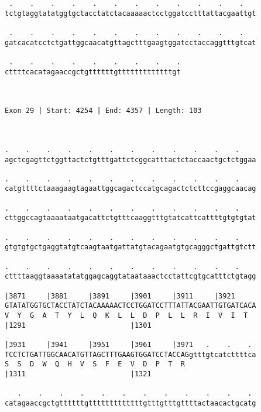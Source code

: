 \documentclass{article}
\begin{document}
\begin{Verbatim}
 .    .    .    .    .    .    .    .    .    .    .    .   
tctgtaggtatatggtgctacctatctacaaaaactcctggatcctttattacgaattgt
                                                            
 .    .    .    .    .    .    .    .    .    .    .    .   
gatcacatcctctgattggcaacatgttagctttgaagtggatcctaccaggtttgtcat
                                                            
 .    .    .    .    .    .    .    .    .
cttttcacatagaaccgctgttttttgtttttttttttttgt
                                          
                                          
 
Exon 29 | Start: 4254 | End: 4357 | Length: 103



.    .    .    .    .    .    .    .    .    .    .    .    
agctcgagttctggttactctgtttgattctcggcatttactctaccaactgctctggaa
                                                            
.    .    .    .    .    .    .    .    .    .    .    .    
catgttttctaaagaagtagaattggcagactccatgcagactctcttccgaggcaacag
                                                            
.    .    .    .    .    .    .    .    .    .    .    .    
cttggccagtaaaataatgacattctgtttcaaggtttgtatcattcattttgtgtgtat
                                                            
.    .    .    .    .    .    .    .    .    .    .    .    
gtgtgtgctgaggtatgtcaagtaatgattatgtacagaatgtgcagggctgattgtctt
                                                            
.    .    .    .    .    .    .    .    .    .    .    .    
cttttaaggtaaaatatatggagcaggtataataaactcctattcgtgcatttctgtagg
                                                            
|3871     |3881     |3891     |3901     |3911     |3921     
GTATATGGTGCTACCTATCTACAAAAACTCCTGGATCCTTTATTACGAATTGTGATCACA
V  Y  G  A  T  Y  L  Q  K  L  L  D  P  L  L  R  I  V  I  T  
|1291                         |1301                         
  
|3931     |3941     |3951     |3961     |3971   .    .    . 
TCCTCTGATTGGCAACATGTTAGCTTTGAAGTGGATCCTACCAGgtttgtcatcttttca
S  S  D  W  Q  H  V  S  F  E  V  D  P  T  R                 
|1311                         |1321                         
  
   .    .    .    .    .    .    .    .    .    .    .    . 
catagaaccgctgttttttgtttttttttttttgtttgtttgttttactaacactgcatg
                                                            

\end{Verbatim}
\end{document}
